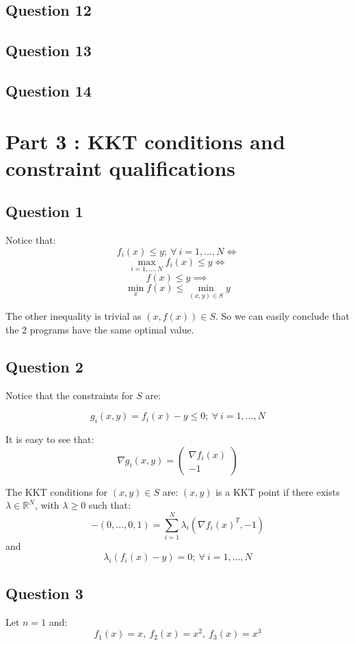 \documentclass[12p]{article}
\begin{document}
\subsection*{Question 12} 

\subsection*{Question 13} 


\subsection*{Question 14} 

\newpage

\section*{Part 3 : KKT conditions and constraint qualifications}

\subsection*{Question 1}\hfil\par
Notice that:
\[f_i(x)\leq y;\ \forall \ i=1,\dots,N\iff\]
\[\max_{i=1,\dots,N}f_i(x)\leq y\iff \]
\[f(x)\leq y \implies \]
\[\min_xf(x)\leq\min_{(x,y)\in S}y\]

The other inequality is trivial as \((x,f(x))\in S\). So we can easily conclude that the 2 programs have the same optimal value.

\subsection*{Question 2}\hfil\par
Notice that the constraints for \(S\) are:

\[
    g_i(x,y)=f_i(x)-y\leq 0;\ \forall \ i=1,\dots,N
\]

It is easy to see that:
\[
    \nabla g_i(x,y)=\begin{pmatrix}
    \nabla f_i(x)\\
     -1
    \end{pmatrix}    
\]

The KKT conditions for \((x,y)\in S\) are: \((x,y)\) is a KKT point if there exists \(\lambda\in\mathbb{R}^N\), with \(\lambda\geq0\) such that:
\[
    -(0,\dots,0,1)=   \sum_{i=1}^{N}\lambda_i(\nabla f_i(x)^T,-1)    
\]
and
\[
    \lambda_i(f_i(x)-y)=0;\ \forall\ i=1,\dots,N  
\]
\subsection*{Question 3}\hfil\par
Let \(n=1\) and:
\[
    f_1(x)=x,\ f_2(x)=x^2,\ f_3(x)=x^3
\]
\end{document}
